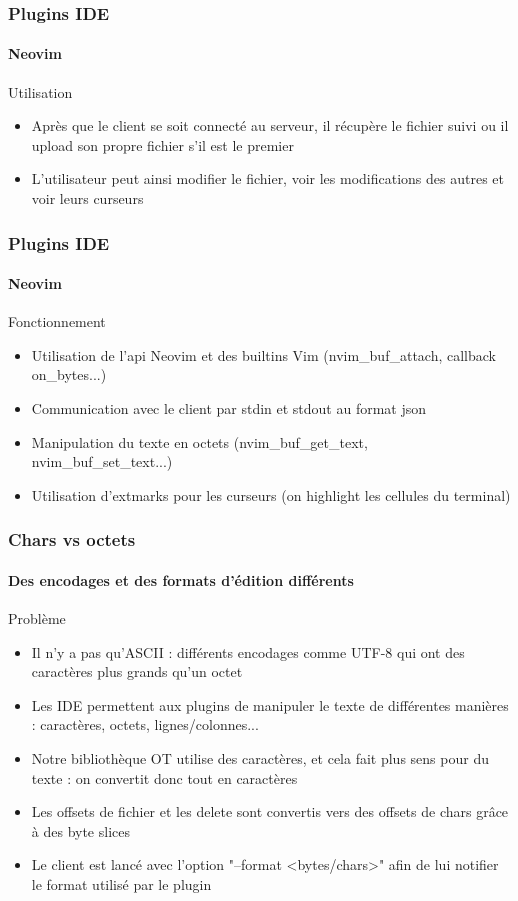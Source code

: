 \documentclass{beamer}
\begin{document}
\begin{frame}
    \frametitle{Plugins IDE}
    \framesubtitle{Neovim}
    \begin{block}{Utilisation}
        \begin{itemize}
            \item Après que le client se soit connecté au serveur, il récupère le fichier suivi ou il upload son propre fichier s'il est le premier
            \item L'utilisateur peut ainsi modifier le fichier, voir les modifications des autres et voir leurs curseurs
        \end{itemize}
    \end{block}
\end{frame}

\begin{frame}
    \frametitle{Plugins IDE}
    \framesubtitle{Neovim}
    \begin{block}{Fonctionnement}
        \begin{itemize}
            \item Utilisation de l'api Neovim et des builtins Vim (nvim\_buf\_attach, callback on\_bytes...)
            \item Communication avec le client par stdin et stdout au format json
            \item Manipulation du texte en octets (nvim\_buf\_get\_text, nvim\_buf\_set\_text...)
            \item Utilisation d'extmarks pour les curseurs (on highlight les cellules du terminal)
        \end{itemize}
    \end{block}
\end{frame}

\begin{frame}
    \frametitle{Chars vs octets}
    \framesubtitle{Des encodages et des formats d'édition différents}
    \begin{block}{Problème}
        \begin{itemize}
            \item Il n'y a pas qu'ASCII : différents encodages comme UTF-8 qui ont des caractères plus grands qu'un octet
            \item Les IDE permettent aux plugins de manipuler le texte de différentes manières : caractères, octets, lignes/colonnes...
            \item Notre bibliothèque OT utilise des caractères, et cela fait plus sens pour du texte : on convertit donc tout en caractères
            \item Les offsets de fichier et les delete sont convertis vers des offsets de chars grâce à des byte slices
            \item Le client est lancé avec l'option "--format <bytes/chars>" afin de lui notifier le format utilisé par le plugin
        \end{itemize}
    \end{block}
\end{frame}
\end{document}
